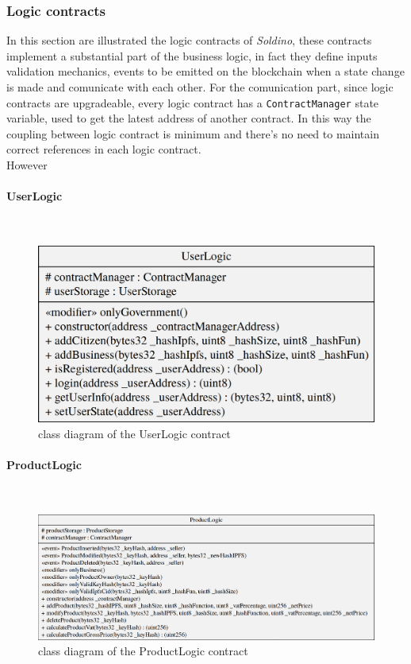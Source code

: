 \subsubsection{Logic contracts}
In this section are illustrated the logic contracts of \textit{Soldino}, these contracts implement a substantial part of the business logic, in fact they define inputs validation mechanics, events to be emitted on the blockchain when a state change is made and comunicate with each other.
For the comunication part, since logic contracts are upgradeable, every logic contract has a \texttt{ContractManager} state variable, used to get the latest address of another contract. In this way the coupling between logic contract is minimum and there's no need to maintain correct references in each logic contract.\\
However
\paragraph{UserLogic}\mbox{}\\
\begin{figure}[H]
	\centering
	\includegraphics[scale=0.20]{res/images/solidity/userlogic.png}
	\caption{class diagram of the UserLogic contract}
\end{figure}

\paragraph{ProductLogic}\mbox{}\\
\begin{figure}[H]
	\centering
	\includegraphics[scale=0.25]{res/images/solidity/productlogic.png}
	\caption{class diagram of the ProductLogic contract}
\end{figure}

